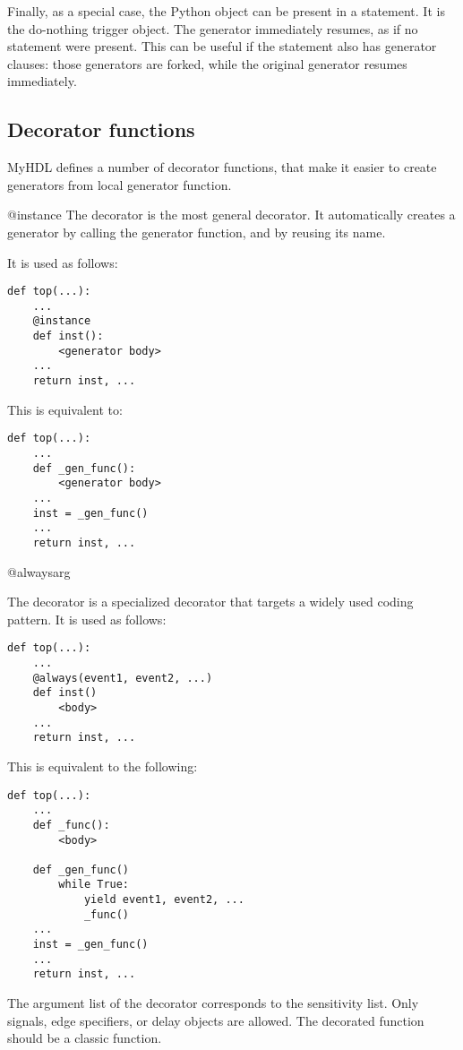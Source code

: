 Finally, as a special case, the Python  object can be
present in a  statement. It is the do-nothing
trigger object. The generator immediately resumes, as if no
 statement were present. This can be useful if the
 statement also has generator clauses: those generators
are forked, while the original generator resumes immediately.

\subsection{Decorator functions \label{ref-deco}}

MyHDL defines a number of decorator functions, that make it easier to
create generators from local generator function.

\begin{funcdesc}{@instance}{}
The  decorator is the most general decorator.  It
automatically creates a generator by calling the generator function,
and by reusing its name.

It is used as follows:

\begin{verbatim}
def top(...):
    ...
    @instance
    def inst():
        <generator body>
    ...
    return inst, ...
\end{verbatim}

This is equivalent to:

\begin{verbatim}
def top(...):
    ...
    def _gen_func():
        <generator body>
    ...
    inst = _gen_func()
    ...
    return inst, ...
\end{verbatim}

\end{funcdesc}
    

\begin{funcdesc}{@always}{arg }

The  decorator is a specialized decorator that targets a widely used
coding pattern. It is used as follows:

\begin{verbatim}
def top(...):
    ...
    @always(event1, event2, ...)
    def inst()
        <body>
    ...
    return inst, ...
\end{verbatim}

This is equivalent to the following:

\begin{verbatim}
def top(...):
    ...
    def _func():
        <body>

    def _gen_func()
        while True:
            yield event1, event2, ... 
            _func()
    ...
    inst = _gen_func()
    ...
    return inst, ...
\end{verbatim}


The argument list of the decorator corresponds to the sensitivity
list. Only signals, edge specifiers, or delay objects are allowed.
The decorated function should be a classic function.


\end{funcdesc}


